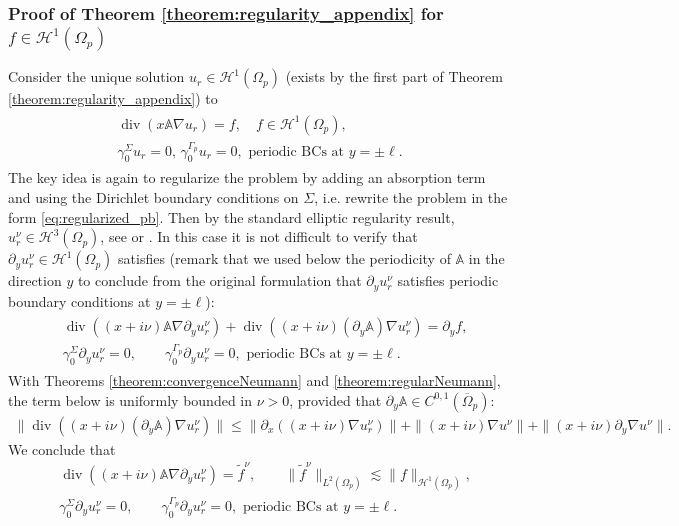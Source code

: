 \documentclass[report]{elsarticle}
\numberwithin{theorem}{section}
\begin{document}
\subsubsection{Proof of Theorem \ref{theorem:regularity_appendix} for $f\in \mathcal{H}^1(\Omega_p)$}
Consider the unique solution $u_r\in \mathcal{H}^1(\Omega_p)$ (exists by the first part of Theorem \ref{theorem:regularity_appendix}) to 
\begin{align}
	\label{eq:divxA}
	\begin{split}
	\operatorname{div}(x\mathbb{A}\nabla u_r)=f, \quad f\in\mathcal{H}^1(\Omega_p), \\
	\gamma_0^{\Sigma}u_r=0, \, \gamma_0^{\Gamma_p}u_r=0, \text{ periodic BCs at }y=\pm\ell.
	\end{split}
\end{align}
The key idea is again to regularize the problem by adding an absorption term and using the Dirichlet boundary conditions on $\Sigma$, i.e. rewrite the problem in the form  \eqref{eq:regularized_pb}. Then by the standard elliptic regularity result, $u^{\nu}_r\in \mathcal{H}^3(\Omega_p)$, see \cite[Theorem 4.18]{mclean} or \cite[Theorem 2.5.1.1]{grisvard_book}. In this case it is not difficult to verify that $\partial_y u^{\nu}_r\in \mathcal{H}^1(\Omega_p)$ satisfies (remark that we used below the periodicity of $\mathbb{A}$ in the direction $y$ to conclude from the original formulation that $\partial_y u^{\nu}_r$ satisfies periodic boundary conditions at $y=\pm\ell$):
\begin{align}
	\label{eq:divxA2}
	\begin{split}
	&\operatorname{div}((x+i\nu)\mathbb{A}\nabla \partial_y u^{\nu}_r)+\operatorname{div}((x+i\nu)(\partial_y\mathbb{A})\nabla u^{\nu}_r)=\partial_y f,\\
	&\gamma_0^{\Sigma}\partial_y u^{\nu}_r=0, \qquad \gamma_0^{\Gamma_p}\partial_y u^{\nu}_r=0, \text{ periodic BCs at }y=\pm \ell. 
	\end{split}
\end{align}
With Theorems \ref{theorem:convergenceNeumann} and \ref{theorem:regularNeumann}, the term below is uniformly bounded in $\nu>0$, provided that $\partial_y\mathbb{A}\in C^{0,1}(\overline{\Omega}_p)$:
\begin{align*} \|\operatorname{div}((x+i\nu)(\partial_y\mathbb{A})\nabla u^{\nu}_r)\|\leq \|\partial_x((x+i\nu)\nabla u^{\nu}_r)\|+\|(x+i\nu)\nabla u^{\nu}\|+\|(x+i\nu)\partial_y \nabla u^{\nu}\|. 
\end{align*}
We conclude that 
\begin{align*}
	&\operatorname{div}((x+i\nu)\mathbb{A}\nabla \partial_y u^{\nu}_r)=\tilde{f}^{\nu},\qquad \|\tilde{f}^{\nu}\|_{L^2(\Omega_p)}\lesssim \|f\|_{\mathcal{H}^1(\Omega_p)},\\
	&\gamma_0^{\Sigma}\partial_y u^{\nu}_r=0, \qquad \gamma_0^{\Gamma_p}\partial_y u^{\nu}_r=0, \text{ periodic BCs at }y=\pm \ell. 
\end{align*}
\end{document}
